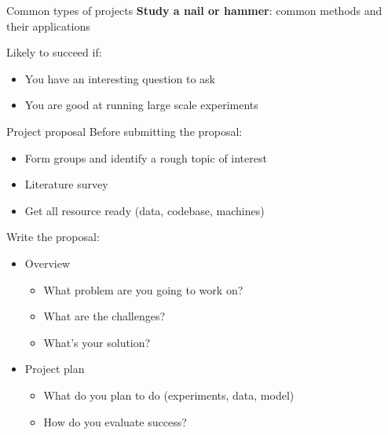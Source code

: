 \documentclass[usenames,dvipsnames,notes,11pt,aspectratio=169,hyperref={colorlinks=true, linkcolor=blue}]{beamer}
\begin{document}
\begin{frame}
    {Common types of projects}
    \textbf{Study a nail or hammer}:  common methods and their applications 


    Likely to succeed if:\\
    \begin{itemize}
        \item You have an interesting question to ask 
        \item You are good at running large scale experiments 
    \end{itemize}
\end{frame}

\begin{frame}
    {Project proposal}
    Before submitting the proposal:\\
    \begin{itemize}
        \item Form groups and identify a rough topic of interest
        \item Literature survey
        \item Get all resource ready (data, codebase, machines)
    \end{itemize}

    \pause
    Write the proposal:\\
    \begin{itemize}
        \item Overview
            \begin{itemize}
        \item What problem are you going to work on?
        \item What are the challenges?
        \item What's your solution?
            \end{itemize}
        \item Project plan
            \begin{itemize}
                \item What do you plan to do (experiments, data, model)
                \item How do you evaluate success?
            \end{itemize}
    \end{itemize}
\end{frame}
\end{document}
